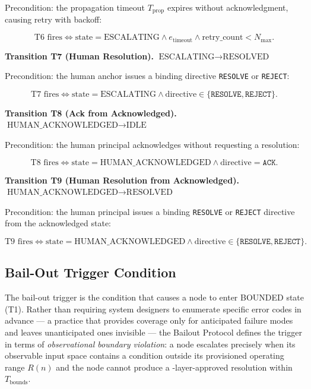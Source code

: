 Precondition: the propagation timeout $T_{\text{prop}}$ expires without acknowledgment, causing retry with backoff:

\begin{equation}
\text{T6 fires} \iff \text{state} = \text{ESCALATING} \land e_{\text{timeout}} \land \text{retry\_count} < N_{\max}. \tag{T6}
\end{equation}

\bigskip
\noindent\textbf{Transition T7 (Human Resolution).} $\text{ESCALATING} \rightarrow \text{RESOLVED}$

Precondition: the human anchor issues a binding directive \texttt{RESOLVE} or \texttt{REJECT}:

\begin{equation}
\text{T7 fires} \iff \text{state} = \text{ESCALATING} \land \text{directive} \in \{\texttt{RESOLVE}, \texttt{REJECT}\}. \tag{T7}
\end{equation}

\bigskip
\noindent\textbf{Transition T8 (Ack from Acknowledged).} $\text{HUMAN\_ACKNOWLEDGED} \rightarrow \text{IDLE}$

Precondition: the human principal acknowledges without requesting a resolution:

\begin{equation}
\text{T8 fires} \iff \text{state} = \text{HUMAN\_ACKNOWLEDGED} \land \text{directive} = \texttt{ACK}. \tag{T8}
\end{equation}

\bigskip
\noindent\textbf{Transition T9 (Human Resolution from Acknowledged).} $\text{HUMAN\_ACKNOWLEDGED} \rightarrow \text{RESOLVED}$

Precondition: the human principal issues a binding \texttt{RESOLVE} or \texttt{REJECT} directive from the acknowledged state:

\begin{equation}
\text{T9 fires} \iff \text{state} = \text{HUMAN\_ACKNOWLEDGED} \land \text{directive} \in \{\texttt{RESOLVE}, \texttt{REJECT}\}. \tag{T9}
\end{equation}

\subsection{Bail-Out Trigger Condition}\label{sec:bailout-trigger}

The bail-out trigger is the condition that causes a node to enter BOUNDED state (T1). Rather than requiring system designers to enumerate specific error codes in advance — a practice that provides coverage only for anticipated failure modes and leaves unanticipated ones invisible — the Bailout Protocol defines the trigger in terms of \emph{observational boundary violation}: a node escalates precisely when its observable input space contains a condition outside its provisioned operating range $R(n)$ and the node cannot produce a \fact-layer-approved resolution within $T_{\text{bounds}}$.

